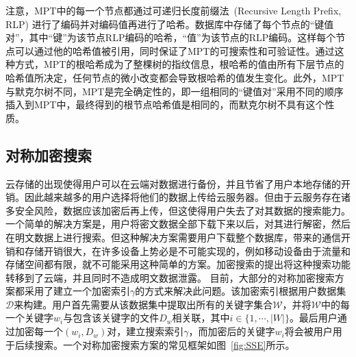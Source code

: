 注意，MPT中的每一个节点都通过可递归长度前缀法~\cite{RLPcode}(Recursive Length Prefix, RLP) 进行了编码并对编码值再进行了哈希。数据库中存储了每个节点的“键值对”，其中“键”为该节点RLP编码的哈希，“值”为该节点的RLP编码。这样每个节点可以通过他的哈希值被引用，同时保证了MPT的可搜索性和可验证性。通过这种方式，MPT的根哈希成为了整棵树的指纹信息，根哈希的值由所有下层节点的哈希值所决定，任何节点的微小改变都会导致根哈希的值发生变化。此外，MPT与默克尔树不同，MPT是完全确定性的，即一组相同的“键值对”采用不同的顺序插入到MPT中，最终得到的根节点哈希值是相同的，而默克尔树不具有这个性质。


\subsection{对称加密搜索}
云存储的出现使得用户可以在云端对数据进行备份，并且节省了用户本地存储的开销。因此越来越多的用户选择将他们的数据上传给云服务器。但由于云服务存在诸多安全风险，数据应该加密后再上传，但这使得用户失去了对其数据的搜索能力。一个简单的解决方案是，用户将密文数据全部下载下来以后，对其进行解密，然后在明文数据上进行搜索。但这种解决方案需要用户下载整个数据库，带来的通信开销和存储开销很大，在许多设备上势必是不可能实现的，例如移动设备由于流量和存储空间都有限，就不可能采用这种简单的方案。加密搜索的提出将这种搜索功能转移到了云端，并且同时不造成明文数据泄露。
目前，大部分的对称加密搜索方案都采用了建立一个加密索引$\gamma$的方式来解决此问题。该加密索引根据用户数据集$\mathcal{D}$来构建。用户首先需要从该数据集中提取出所有的关键字集合$\mathcal{W}$，并将$\mathcal{W}$中的每一个关键字$w_i$与包含该关键字的文件$D_w$相关联，其中$i \in \{1,\cdots, |W|\}$。最后用户通过加密每一个$(w_i, D_w)$对，建立搜索索引$\gamma$，而加密后的关键字$w_i$将会被用户用于后续搜索。一个对称加密搜索方案的常见框架如图~\ref{fig:SSE}所示。

